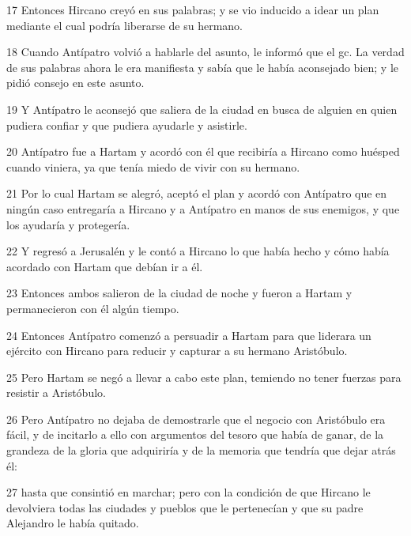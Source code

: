 \par 17 Entonces Hircano creyó en sus palabras; y se vio inducido a idear un plan mediante el cual podría liberarse de su hermano.

\par 18 Cuando Antípatro volvió a hablarle del asunto, le informó que el gc. La verdad de sus palabras ahora le era manifiesta y sabía que le había aconsejado bien; y le pidió consejo en este asunto.

\par 19 Y Antípatro le aconsejó que saliera de la ciudad en busca de alguien en quien pudiera confiar y que pudiera ayudarle y asistirle.

\par 20 Antípatro fue a Hartam y acordó con él que recibiría a Hircano como huésped cuando viniera, ya que tenía miedo de vivir con su hermano.

\par 21 Por lo cual Hartam se alegró, aceptó el plan y acordó con Antípatro que en ningún caso entregaría a Hircano y a Antípatro en manos de sus enemigos, y que los ayudaría y protegería.

\par 22 Y regresó a Jerusalén y le contó a Hircano lo que había hecho y cómo había acordado con Hartam que debían ir a él.

\par 23 Entonces ambos salieron de la ciudad de noche y fueron a Hartam y permanecieron con él algún tiempo.

\par 24 Entonces Antípatro comenzó a persuadir a Hartam para que liderara un ejército con Hircano para reducir y capturar a su hermano Aristóbulo.

\par 25 Pero Hartam se negó a llevar a cabo este plan, temiendo no tener fuerzas para resistir a Aristóbulo.

\par 26 Pero Antípatro no dejaba de demostrarle que el negocio con Aristóbulo era fácil, y de incitarlo a ello con argumentos del tesoro que había de ganar, de la grandeza de la gloria que adquiriría y de la memoria que tendría que dejar atrás él:

\par 27 hasta que consintió en marchar; pero con la condición de que Hircano le devolviera todas las ciudades y pueblos que le pertenecían y que su padre Alejandro le había quitado.

